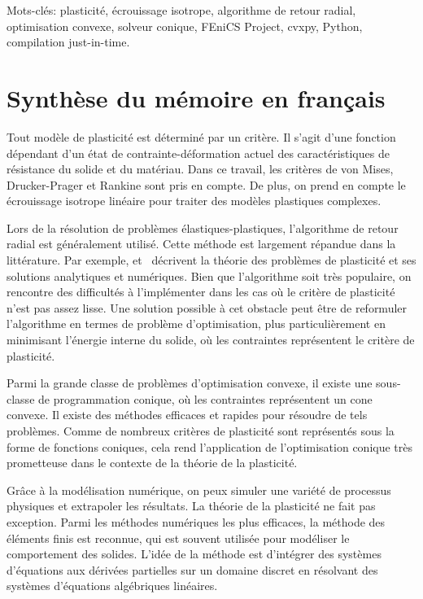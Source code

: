 \documentclass[12pt]{article}
\begin{document}
Mots-clés: plasticité, écrouissage isotrope, algorithme de retour radial, optimisation convexe, solveur conique, FEniCS Project, cvxpy, Python, compilation just-in-time.

\newpage
\section*{\centering Synthèse du mémoire en français}
Tout modèle de plasticité est déterminé par un critère. Il s'agit d'une fonction dépendant d'un état de contrainte-déformation actuel des caractéristiques de résistance du solide et du matériau. Dans ce travail, les critères de von Mises, Drucker-Prager et Rankine sont pris en compte. De plus, on prend en compte le écrouissage isotrope linéaire pour traiter des modèles plastiques complexes.

Lors de la résolution de problèmes élastiques-plastiques, l'algorithme de retour radial est généralement utilisé. Cette méthode est largement répandue dans la littérature. Par exemple, \textcite{bonnet:hal-01083772} et~\textcite{nonlinear_FEM2012} décrivent la théorie des problèmes de plasticité et ses solutions analytiques et numériques. Bien que l'algorithme soit très populaire, on rencontre des difficultés à l'implémenter dans les cas où le critère de plasticité n'est pas assez lisse. Une solution possible à cet obstacle peut être de reformuler l'algorithme en termes de problème d'optimisation, plus particulièrement en minimisant l'énergie interne du solide, où les contraintes représentent le critère de plasticité.


Parmi la grande classe de problèmes d'optimisation convexe, il existe une sous-classe de programmation conique, où les contraintes représentent un cone convexe. Il existe des méthodes efficaces et rapides pour résoudre de tels problèmes. Comme de nombreux critères de plasticité sont représentés sous la forme de fonctions coniques, cela rend l'application de l'optimisation conique très prometteuse dans le contexte de la théorie de la plasticité.

Grâce à la modélisation numérique, on peux simuler une variété de processus physiques et extrapoler les résultats. La théorie de la plasticité ne fait pas exception. Parmi les méthodes numériques les plus efficaces, la méthode des éléments finis est reconnue, qui est souvent utilisée pour modéliser le comportement des solides. L'idée de la méthode est d'intégrer des systèmes d'équations aux dérivées partielles sur un domaine discret en résolvant des systèmes d'équations algébriques linéaires. 
\end{document}
